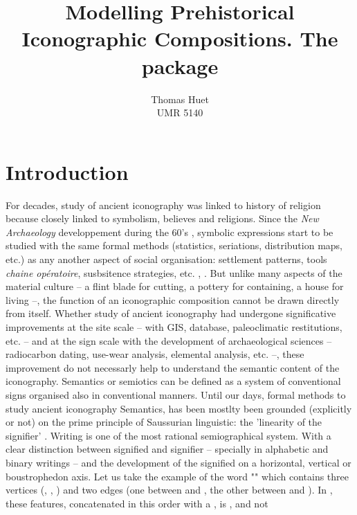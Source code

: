 \documentclass[article]{jss}\usepackage{knitr}
\author{Thomas Huet\\UMR 5140}
\title{Modelling Prehistorical Iconographic Compositions. The \proglang{R} package \pkg{decorr}}
\begin{document}

\section[Introduction]{Introduction} \label{sec:intro}

For decades, study of ancient iconography was linked to history of religion because closely linked to symbolism, believes and religions. Since the \textit{New Archaeology} developpement during the 60's \citep{Clarke14}, symbolic expressions start to be studied with the same formal methods (statistics, seriations, distribution maps, etc.) as any another aspect of social organisation: settlement patterns, tools \emph{chaine opératoire}, susbsitence strategies, etc. \citep{Renfrew91}, \citep{LeroiGourhan92}. But unlike many aspects of the material culture -- a flint blade for cutting, a pottery for containing, a house for living --, the function of an iconographic composition cannot be drawn directly from itself. Whether study of ancient iconography had  undergone significative improvements at the site scale -- with GIS, database, paleoclimatic restitutions, etc. -- and at the sign scale with the development of archaeological sciences -- radiocarbon dating, use-wear analysis, elemental analysis, etc. --, these improvement do not necessarly help to understand the semantic content of the iconography.
Semantics or semiotics can be defined as a system of conventional signs organised also in conventional manners.  
Until our days, formal methods to study ancient iconography Semantics, has been mostlty been grounded (explicitly or not) on the prime principle of Saussurian linguistic: the 'linearity of the signifier' \citep{Saussure89}.  
Writing is one of the most rational semiographical system. With a clear distinction between signified and signifier -- specially in alphabetic and binary writings -- and the development of the signified on a horizontal, vertical or boustrophedon axis. 
Let us take the example of the word "" which contains three vertices (, , ) and two edges (one between  and , the other between  and ). In , these features, concatenated in this order with a , is , and not 
\end{document}
